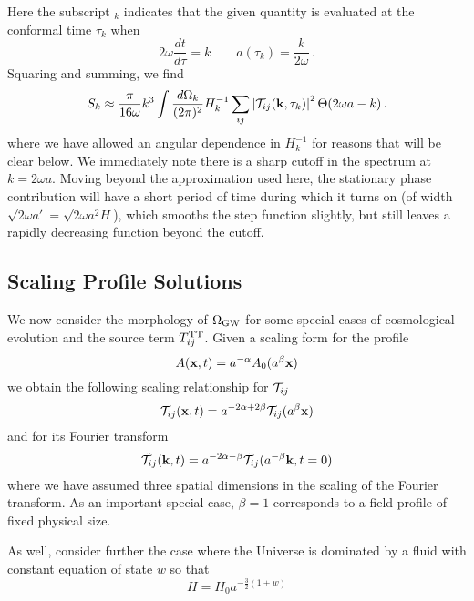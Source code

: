 \documentclass{revtex4}
\begin{document}
Here the subscript ${}_k$ indicates that the given quantity is evaluated at the conformal time $\tau_k$ when
\begin{equation}
  2\omega\frac{dt}{d\tau} = k \qquad a(\tau_k) = \frac{k}{2\omega} \, .
\end{equation}
Squaring and summing, we find
\begin{equation}
  S_k \approx \frac{\pi}{16\omega}k^3\int \frac{d\Omega_k}{(2\pi)^2} H_k^{-1}\sum_{ij}\left|\mathcal{T}_{ij}({\bf k},\tau_k)\right|^2\Theta(2\omega a - k) \, .
\end{equation}
where we have allowed an angular dependence in $H_k^{-1}$ for reasons that will be clear below.
We immediately note there is a sharp cutoff in the spectrum at $k = 2\omega a$.
Moving beyond the approximation used here, the stationary phase contribution will have a short period of time during which it turns on (of width $\sqrt{2\omega a'} = \sqrt{2\omega a^2 H}$), which smooths the step function slightly, but still leaves a rapidly decreasing function beyond the cutoff.

\subsection{Scaling Profile Solutions}
We now consider the morphology of $\Omega_{\rm GW}$ for some special cases of cosmological evolution and the source term $T_{ij}^{{\rm TT}}$.
Given a scaling form for the profile
\begin{equation}
  A({\bf x},t) = a^{-\alpha} A_0(a^\beta{\bf x})
\end{equation}
we obtain the following scaling relationship for $\mathcal{T}_{ij}$
\begin{equation}
  \mathcal{T}_{ij}({\bf x},t) = a^{-2\alpha+2\beta}\mathcal{T}_{ij}(a^\beta{\bf x})
\end{equation}
and for its Fourier transform
\begin{equation}
  \tilde{\mathcal{T}_{ij}}({\bf k},t) = a^{-2\alpha-\beta}\tilde{\mathcal{T}_{ij}}(a^{-\beta}{\bf k},t=0)
\end{equation}
where we have assumed three spatial dimensions in the scaling of the Fourier transform.
As an important special case, $\beta=1$ corresponds to a field profile of fixed physical size.

As well, consider further the case where the Universe is dominated by a fluid with constant equation of state $w$ so that
\begin{equation}
  H = H_0 a^{-\frac{3}{2}(1+w)}
\end{equation}
\end{document}
